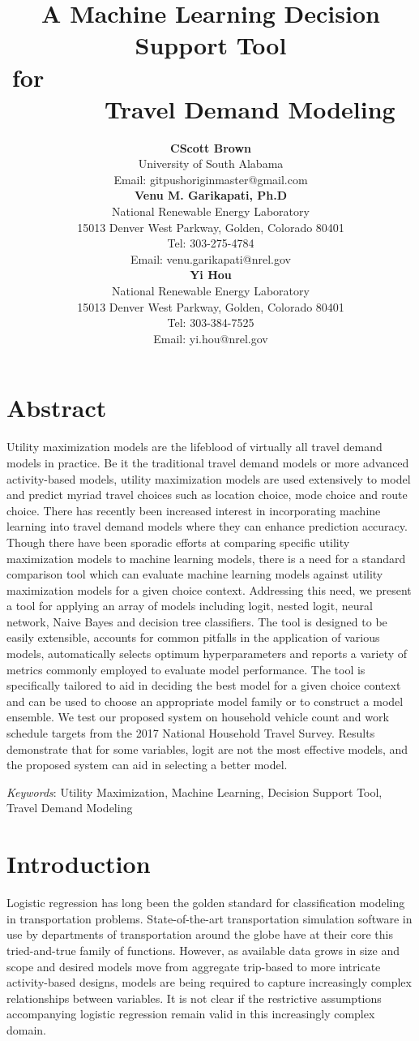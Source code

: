 \documentclass[numbered]{trbunofficial}
\title{A Machine Learning Decision Support Tool for\ \ \ \ \ \ \ \ \ \ \ \ \ \ \ \ \ \ \ \ \ \ \ \ \ \ \ \ \ \ \ \ \ \  Travel Demand Modeling}
\author{%
  \textbf{CScott Brown}\\
University of South Alabama\\
Email: gitpushoriginmaster@gmail.com\\
  \hfill\break%
  \textbf{Venu M. Garikapati, Ph.D}\\
National Renewable Energy Laboratory\\
15013 Denver West Parkway, Golden, Colorado 80401\\
Tel: 303-275-4784\\
Email: venu.garikapati@nrel.gov\\
  \hfill\break%
  \textbf{Yi Hou}\\
National Renewable Energy Laboratory\\
15013 Denver West Parkway, Golden, Colorado 80401\\
Tel: 303-384-7525\\
Email: yi.hou@nrel.gov \\
}
\begin{document}
\maketitle



\section{Abstract}
Utility maximization models are the lifeblood of virtually all travel demand models in practice. 
 Be it the traditional travel demand models or more advanced activity-based models, utility maximization models are used extensively to model and predict myriad travel choices such as location choice, mode choice and route choice. 
 There has recently been increased interest in incorporating machine learning into travel demand models where they can enhance prediction accuracy. 
 Though there have been sporadic efforts at comparing specific utility maximization models to machine learning models, there is a need for a standard comparison tool which can evaluate machine learning models against utility maximization models for a given choice context. 
 Addressing this need, we present a tool for applying an array of models including logit, nested logit, neural network, Naive Bayes and decision tree classifiers. 
 The tool is designed to be easily extensible, accounts for common pitfalls in the application of various models, automatically selects optimum hyperparameters and reports a variety of metrics commonly employed to evaluate model performance. 
 The tool is specifically tailored to aid in deciding the best model for a given choice context and can be used to choose an appropriate model family or to construct a model ensemble. 
 We test our proposed system on household vehicle count and work schedule targets from the 2017 National Household Travel Survey. 
 Results demonstrate that for some variables, logit are not the most effective models, and the proposed system can aid in selecting a better model.

\hfill\break%
\noindent\textit{Keywords}: Utility Maximization, Machine Learning, Decision Support Tool, Travel Demand Modeling
\newpage

\section{Introduction}\label{section:introduction}
Logistic regression has long been the golden standard for classification modeling in transportation problems.
 State-of-the-art transportation simulation software  in use by departments of transportation around the globe have at their core this tried-and-true family of functions.
 However, as available data grows in size and scope and desired models move from aggregate trip-based to more intricate activity-based designs, models are being required to capture increasingly complex relationships between variables.
 It is not clear if the restrictive assumptions accompanying logistic regression remain valid in this increasingly complex domain.
 
\end{document}
